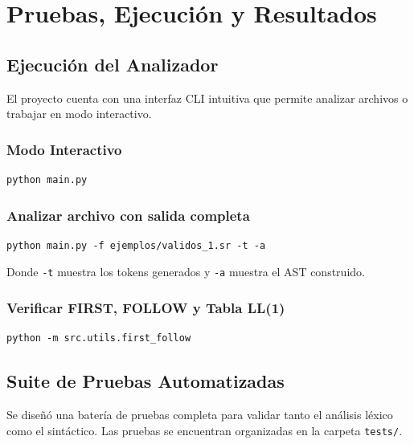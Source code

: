 \documentclass[12pt,a4paper]{article}
\begin{document}
\newpage

\section{Pruebas, Ejecución y Resultados}

\subsection{Ejecución del Analizador}
El proyecto cuenta con una interfaz CLI intuitiva que permite analizar archivos o trabajar en modo interactivo.

\subsubsection{Modo Interactivo}
\begin{lstlisting}[style=bashstyle]
python main.py
\end{lstlisting}

\subsubsection{Analizar archivo con salida completa}
\begin{lstlisting}[style=bashstyle]
python main.py -f ejemplos/validos_1.sr -t -a
\end{lstlisting}

Donde \texttt{-t} muestra los tokens generados y \texttt{-a} muestra el AST construido.

\subsubsection{Verificar FIRST, FOLLOW y Tabla LL(1)}
\begin{lstlisting}[style=bashstyle]
python -m src.utils.first_follow
\end{lstlisting}

\subsection{Suite de Pruebas Automatizadas}
Se diseñó una batería de pruebas completa para validar tanto el análisis léxico como el sintáctico. Las pruebas se encuentran organizadas en la carpeta \texttt{tests/}.
\end{document}
